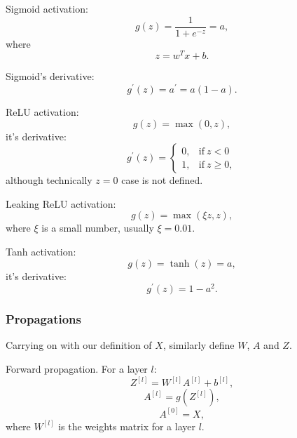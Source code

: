 \documentclass[a4paper,11pt]{article}
\begin{document}
Sigmoid activation:
\begin{equation}
g(z) = \frac{1}{1 + e^{-z}} = a,
\end{equation}
where
\begin{equation}
z = w^T x + b .
\end{equation}

Sigmoid's derivative:
\begin{equation}
g^\prime (z) = a^\prime = a(1-a) .
\end{equation}

ReLU activation:
\begin{equation}
g(z) = \max \left( 0 , z \right) ,
\end{equation}
it's derivative:
\begin{equation}
g^\prime (z) = \begin{cases}
      0, & \text{if}\ z < 0 \\
      1, & \text{if}\ z \geq 0 ,
    \end{cases}
\end{equation}
although technically \textcolor{OliveGreen}{$z=0$} case is not defined.

Leaking ReLU activation:
\begin{equation}
g(z) = \max \left( \xi z , z \right) ,
\end{equation}
where \textcolor{OliveGreen}{$\xi$} is a small number, usually \textcolor{OliveGreen}{$\xi = 0.01$}.

Tanh activation:
\begin{equation}
g(z) = \tanh (z) = a,
\end{equation}
it's derivative:
\begin{equation}
g^\prime (z) = 1 - a^2 .
\end{equation}
\subsubsection{Propagations}
Carrying on with our definition of \textcolor{OliveGreen}{$X$}, similarly define \textcolor{OliveGreen}{$W$}, \textcolor{OliveGreen}{$A$} and \textcolor{OliveGreen}{$Z$}.

Forward propagation. For a layer \textcolor{OliveGreen}{$l$}:
\begin{equation}
Z^{[l]} = W^{[l]} A^{[l]} + b^{[l]} ,
\end{equation}
\begin{equation}
A^{[l]} = g \left( Z^{[l]} \right) ,
\end{equation}
\begin{equation}
A^{[0]} = X ,
\end{equation}
where \textcolor{OliveGreen}{$W^{[l]}$} is the weights matrix for a layer \textcolor{OliveGreen}{$l$}.
\end{document}
